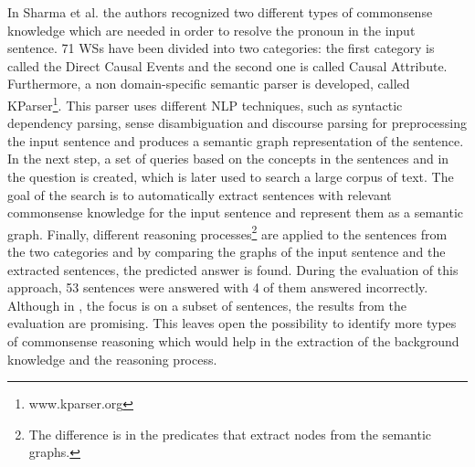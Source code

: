 In Sharma et al. \cite{DBLP:conf/ijcai/SharmaVAB15} the authors recognized two different types of commonsense knowledge which are needed in order to resolve the pronoun in the input sentence. 
71 WSs have been divided into two categories: the first category is called the Direct Causal Events and the second one is called Causal Attribute. Furthermore, a non domain-specific semantic parser is developed, called KParser\footnote{www.kparser.org}. This parser uses different NLP techniques, such as syntactic dependency parsing, sense disambiguation and discourse parsing for preprocessing the input sentence and produces a semantic graph representation of the sentence. In the next step, a set of queries based on the concepts in the sentences and in the question is created, which is later used to search a large corpus of text. The goal of the search is to automatically extract sentences with relevant commonsense knowledge for the input sentence and represent them as a semantic graph. Finally, different reasoning processes\footnote{The difference is in the predicates that extract nodes from the semantic graphs.} are applied to the sentences from the two categories and by comparing the graphs of the input sentence and the extracted sentences, the predicted answer is found. During the evaluation of this approach, 53 sentences were answered with 4 of them answered incorrectly. 
Although in \cite{DBLP:conf/ijcai/SharmaVAB15}, the focus is on a subset of sentences, the results from the evaluation are promising. This leaves open the possibility to identify more types of commonsense reasoning which would help in the extraction of the background knowledge and the reasoning process.

